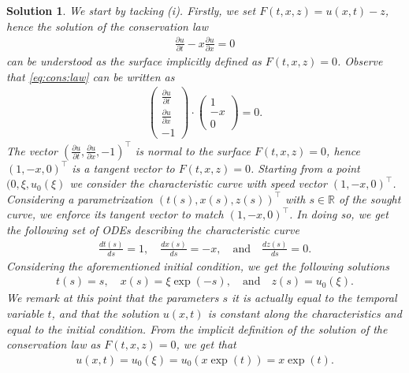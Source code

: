 \documentclass[10pt,letterpaper]{article}
\theoremstyle{break}
\newtheorem{solution}{Solution}
\begin{document}
\begin{solution}
	We start by tacking (i).
	Firstly, we set $F(t,x,z) = u(x,t) -z$, hence the solution
	of the conservation law
	\begin{align}\label{eq:cons:law}
		\frac{\partial u}{\partial t}
		-
		x
		\frac{\partial u}{\partial x}
		= 0
	\end{align}
	can be understood as the surface implicitly defined as $F(t,x,z) = 0$.
	Observe that \ref{eq:cons:law} can be written as
	\begin{align}
		\begin{pmatrix}
			\frac{\partial u}{\partial t} \\
			\frac{\partial u}{\partial x} \\
			-1
		\end{pmatrix}
		\cdot
		\begin{pmatrix}
		1 \\
		-x \\
		0
		\end{pmatrix}
		= 0.
	\end{align}
	The vector $(\frac{\partial u}{\partial t},\frac{\partial u}{\partial x} ,-1)^\top $
	is normal to the surface $F(t,x,z) =0$, hence
	$(1,-x,0)^\top$ is a tangent vector to $F(t,x,z) =0$.
	Starting from a point $(0,\xi,u_0(\xi)$ we consider the characteristic curve
	with speed vector $(1,-x,0)^\top$. Considering a parametrization
	$(t(s),x(s),z(s))^\top$ with $s \in \mathbb{R}$ of the sought curve, we enforce its tangent 
	vector to match $ (1,-x,0)^\top$. In doing so, we get the following set of ODEs
	describing the characteristic curve
	\begin{align}
		\frac{dt(s)}{ds} =1,
		\quad
		\frac{dx(s)}{ds} =-x,
		\quad
		\text{and}
		\quad
		\frac{dz(s)}{ds} =0.
	\end{align}
	Considering the aforementioned initial condition, we get the following solutions
	\begin{align}
		t(s) =s,
		\quad
		x(s) = \xi \exp(-s),
		\quad
		\text{and}
		\quad
		z(s) = u_0(\xi).
	\end{align}
	We remark at this point that the parameters $s$ it is 
	actually equal to the temporal variable $t$, and that
	the solution $u(x,t)$ is constant along the characteristics
	and equal to the initial condition. 
	From the implicit definition of the solution of the conservation law
	as $F(t,x,z) =0$, we get that 
	\begin{align}\label{eq:cons:law_sol}
		u(x,t) = u_0(\xi) = u_0(x \exp(t)) = x \exp(t).
	\end{align}

\end{solution}
\end{document}

